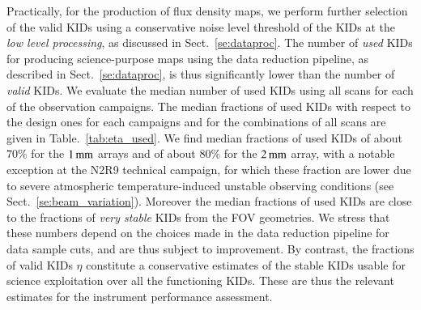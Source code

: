 Practically, for the production of flux density maps, we perform
further selection of the valid KIDs using a conservative noise level
threshold of the KIDs at the \emph{low level processing}, as discussed in
Sect.~\ref{se:dataproc}. The number of \emph{used} KIDs for producing
science-purpose maps using the data reduction pipeline, as described
in Sect.~\ref{se:dataproc}, is thus significantly lower than the number of
\emph{valid} KIDs. We evaluate the median number of used KIDs using all scans
for each of the observation campaigns. The median fractions of used
KIDs with respect to the design ones for each campaigns and for the
combinations of all scans are given in Table.~\ref{tab:eta_used}. We
find median fractions of used KIDs of about $70\%$ for the
$1\, \rm{mm}$ arrays and of about $80\%$ for the $2\, \rm{mm}$ array,
with a notable exception at the N2R9 technical campaign, for which
these fraction are lower due to severe {\lp atmospheric} temperature-induced
unstable observing conditions (see
Sect.~\ref{se:beam_variation}). Moreover the median fractions of used
KIDs are close to the fractions of
\emph{very stable} KIDs from the FOV geometries. We stress that these numbers
depend on the choices made in the data reduction pipeline for data
sample cuts, and are thus subject to improvement. By contrast, the
fractions of valid KIDs $\eta$ constitute a conservative estimates of the
stable KIDs usable for science exploitation over all the functioning
KIDs. These are thus the relevant estimates for the instrument
performance assessment.  
 
